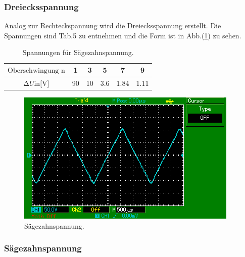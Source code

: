 \subsubsection{Dreiecksspannung}
Analog zur Rechteckspannung wird die Dreiecksspannung erstellt. Die Spannungen
sind Tab.5 zu entnehmen und die Form ist in Abb.(\ref{fig:dreie}) zu sehen.
\begin{table}[h]
  \centering
  \label{tab:5}
  \begin{tabular}{ c c c c c c }
    \toprule
   $ \text{Oberschwingung n} $ & 1 & 3 & 5 & 7 & 9 \\
    \midrule
   $\increment{U} \text{in[V]}$ &90 & 10 &3.6 &1.84 & 1.11 \\
    \bottomrule
  \end{tabular}
  \caption{Spannungen für Sägezahnspannung.}
\end{table}
\begin{figure}[H]
  \centering
  \includegraphics{content/images/dreieck.png}
  \caption{Sägezahnspannung.}
  \label{fig:dreie}
\end{figure}
\subsubsection{Sägezahnspannung}

